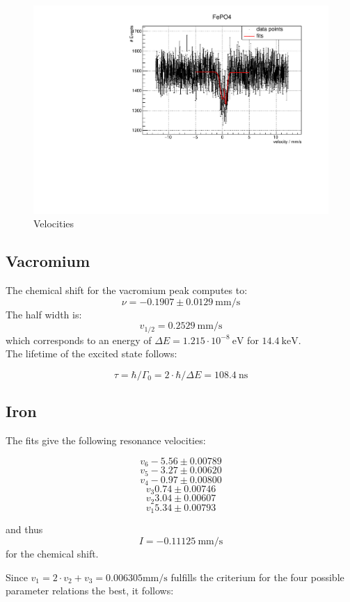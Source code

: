 \begin{figure}
\label{fig:fep}
\centering
\includegraphics[scale = 0.5]{../plots/FePO4.pdf}
\caption{Velocities}
\end{figure}



\FloatBarrier

\subsection{Vacromium}

The chemical shift for the vacromium peak computes to:
$$\nu = -0.1907 \pm 0.0129 \ \text{mm}/\text{s}$$
The half width is:
$$v_{1/2} = 0.2529 \ \text{mm}/\text{s}$$
which corresponds to an energy of $\Delta E = 1.215 \cdot 10^{-8} \ \text{eV}$ for $14.4 \ \text{keV}$.\\
The lifetime of the excited state follows:

$$\tau = \hbar / \Gamma_0 = 2 \cdot \hbar / \Delta E = 108.4 \ \text{ns}$$


\subsection{Iron}
The fits give the following resonance velocities:

$$v_6-5.56 \pm  0.00789$$
$$v_5-3.27 \pm  0.00620$$
$$v_4-0.97 \pm  0.00800$$
$$v_3 0.74 \pm  0.00746$$
$$v_2 3.04 \pm  0.00607$$
$$v_1 5.34 \pm  0.00793$$

and thus
$$I = -0.11125 \ \text{mm}/\text{s}$$
for the chemical shift.

Since $v_1 = 2\cdot v_2 + v_3 = 0.006305 \text{mm}/\text{s}$ fulfills the criterium for the four possible parameter relations the best, it follows:

